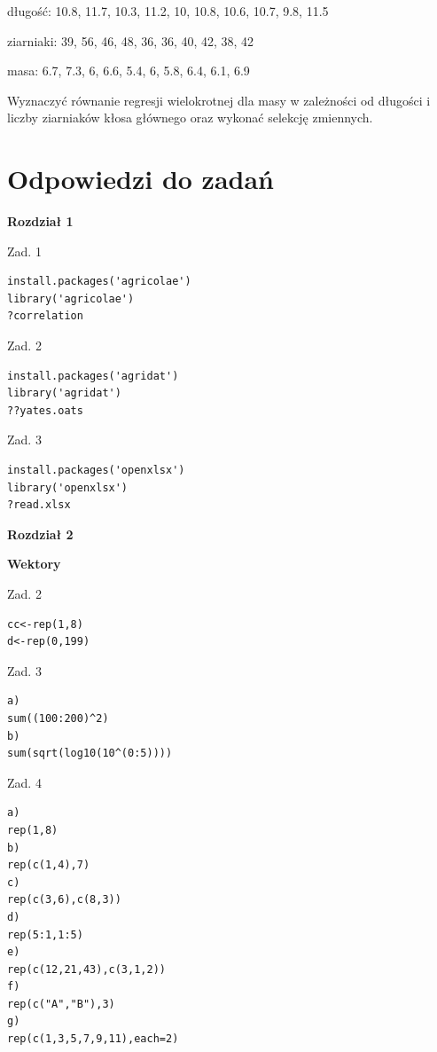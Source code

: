 \documentclass[12pt,B5paper,]{book}
\begin{document}
długość: 10.8, 11.7, 10.3, 11.2, 10, 10.8, 10.6, 10.7, 9.8, 11.5

ziarniaki: 39, 56, 46, 48, 36, 36, 40, 42, 38, 42

masa: 6.7, 7.3, 6, 6.6, 5.4, 6, 5.8, 6.4, 6.1, 6.9

Wyznaczyć równanie regresji wielokrotnej dla masy w zależności od
długości i liczby ziarniaków kłosa głównego oraz wykonać selekcję
zmiennych.

\chapter{Odpowiedzi do zadań}\label{odpowiedzi-do-zadan}

\textbf{Rozdział 1}

Zad. 1

\begin{verbatim}
install.packages('agricolae')
library('agricolae')
?correlation
\end{verbatim}

Zad. 2

\begin{verbatim}
install.packages('agridat')
library('agridat')
??yates.oats
\end{verbatim}

Zad. 3

\begin{verbatim}
install.packages('openxlsx')
library('openxlsx')
?read.xlsx
\end{verbatim}

\newpage

\textbf{Rozdział 2}

\textbf{Wektory}

Zad. 2

\begin{verbatim}
cc<-rep(1,8)
d<-rep(0,199)
\end{verbatim}

Zad. 3

\begin{verbatim}
a)
sum((100:200)^2)
b)
sum(sqrt(log10(10^(0:5)))) 
\end{verbatim}

Zad. 4

\begin{verbatim}
a)
rep(1,8)
b)
rep(c(1,4),7) 
c)
rep(c(3,6),c(8,3))
d)
rep(5:1,1:5)
e)
rep(c(12,21,43),c(3,1,2)) 
f)
rep(c("A","B"),3)
g)
rep(c(1,3,5,7,9,11),each=2)
\end{verbatim}

\newpage
\end{document}
